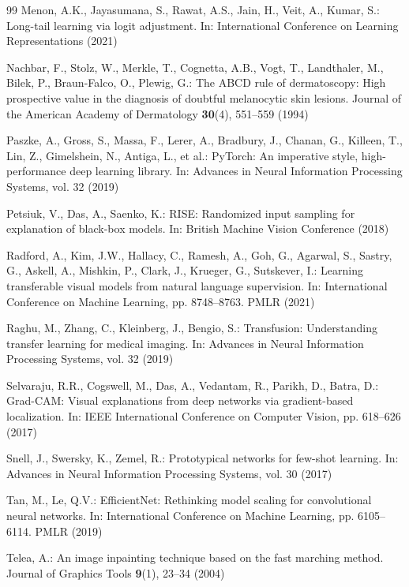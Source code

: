 \documentclass[runningheads]{llncs}
\begin{document}
\begin{thebibliography}{99}
Menon, A.K., Jayasumana, S., Rawat, A.S., Jain, H., Veit, A., Kumar, S.: Long-tail learning via logit adjustment. In: International Conference on Learning Representations (2021)

Nachbar, F., Stolz, W., Merkle, T., Cognetta, A.B., Vogt, T., Landthaler, M., Bilek, P., Braun-Falco, O., Plewig, G.: The ABCD rule of dermatoscopy: High prospective value in the diagnosis of doubtful melanocytic skin lesions. Journal of the American Academy of Dermatology \textbf{30}(4), 551--559 (1994)

Paszke, A., Gross, S., Massa, F., Lerer, A., Bradbury, J., Chanan, G., Killeen, T., Lin, Z., Gimelshein, N., Antiga, L., et al.: PyTorch: An imperative style, high-performance deep learning library. In: Advances in Neural Information Processing Systems, vol. 32 (2019)

Petsiuk, V., Das, A., Saenko, K.: RISE: Randomized input sampling for explanation of black-box models. In: British Machine Vision Conference (2018)

Radford, A., Kim, J.W., Hallacy, C., Ramesh, A., Goh, G., Agarwal, S., Sastry, G., Askell, A., Mishkin, P., Clark, J., Krueger, G., Sutskever, I.: Learning transferable visual models from natural language supervision. In: International Conference on Machine Learning, pp. 8748--8763. PMLR (2021)

Raghu, M., Zhang, C., Kleinberg, J., Bengio, S.: Transfusion: Understanding transfer learning for medical imaging. In: Advances in Neural Information Processing Systems, vol. 32 (2019)

Selvaraju, R.R., Cogswell, M., Das, A., Vedantam, R., Parikh, D., Batra, D.: Grad-CAM: Visual explanations from deep networks via gradient-based localization. In: IEEE International Conference on Computer Vision, pp. 618--626 (2017)

Snell, J., Swersky, K., Zemel, R.: Prototypical networks for few-shot learning. In: Advances in Neural Information Processing Systems, vol. 30 (2017)

Tan, M., Le, Q.V.: EfficientNet: Rethinking model scaling for convolutional neural networks. In: International Conference on Machine Learning, pp. 6105--6114. PMLR (2019)

Telea, A.: An image inpainting technique based on the fast marching method. Journal of Graphics Tools \textbf{9}(1), 23--34 (2004)


\end{thebibliography}
\end{document}

